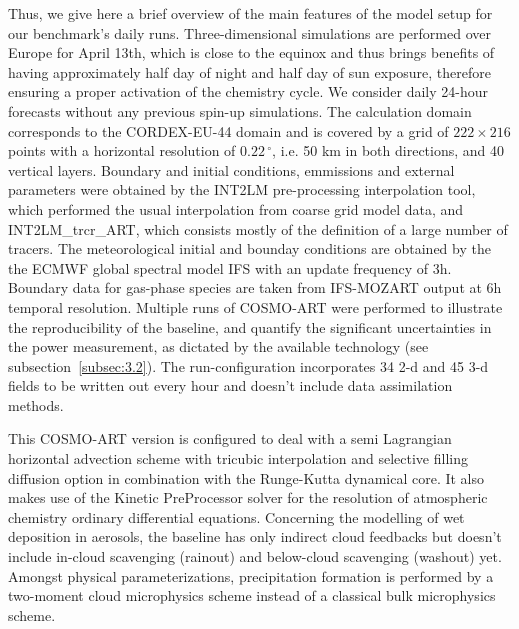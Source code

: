 Thus, we give here a brief  overview of the main features of the model
setup for  our benchmark's daily  runs.  Three-dimensional simulations
are  performed over  Europe  for April  13th,  which is  close to  the
equinox and thus  brings benefits of having approximately  half day of
night  and half  day  of  sun exposure,  therefore  ensuring a  proper
activation of the chemistry cycle. We consider daily 24-hour forecasts
without  any  previous spin-up  simulations.   The calculation  domain
corresponds to  the CORDEX-EU-44  domain and is  covered by a  grid of
$222\times   216$    points   with   a    horizontal   resolution   of
$0.22\,^{\circ}$,  i.e.  50  km in  both directions,  and  40 vertical
layers.   Boundary  and initial  conditions,  emmissions and  external
parameters  were obtained by  the INT2LM  pre-processing interpolation
tool, which  performed the usual interpolation from  coarse grid model
data, and  INT2LM\_trcr\_ART, which consists mostly  of the definition
of a large number of  tracers.  The meteorological initial and bounday
conditions are  obtained by  the the ECMWF  global spectral  model IFS
with an update  frequency of 3h.  Boundary data  for gas-phase species
are taken from IFS-MOZART  output at 6h temporal resolution.  Multiple
runs of COSMO-ART were  performed to illustrate the reproducibility of
the baseline, and quantify  the significant uncertainties in the power
measurement,   as   dictated   by   the  available   technology   (see
subsection~\ref{subsec:3.2}).   The run-configuration  incorporates 34
2-d and 45 3-d fields to be written out every hour and doesn't include
data assimilation methods.

This COSMO-ART  version is configured  to deal with a  semi Lagrangian
horizontal advection scheme  with tricubic interpolation and selective
filling diffusion option in combination with the Runge-Kutta dynamical
core. It  also makes  use of the  Kinetic PreProcessor solver  for the
resolution of  atmospheric chemistry ordinary  differential equations.
Concerning the  modelling of wet deposition in  aerosols, the baseline
has  only  indirect  cloud  feedbacks  but  doesn't  include  in-cloud
scavenging  (rainout)   and  below-cloud  scavenging   (washout)  yet.
Amongst   physical  parameterizations,   precipitation   formation  is
performed  by a  two-moment  cloud microphysics  scheme  instead of  a
classical  bulk microphysics  scheme.
